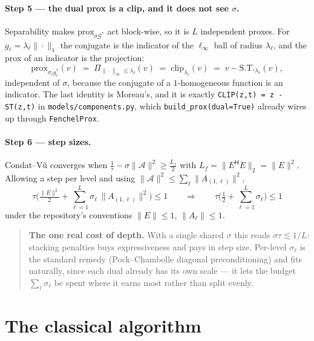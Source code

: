 \documentclass[11pt]{article}
\newcommand{\ST}{\mathrm{S.T.}}
\newcommand{\clip}{\mathrm{clip}}
\newcommand{\bA}{\mathcal{A}}
\newcommand{\bG}{\mathcal{G}}
\newcommand{\adj}{{\mathsf H}}
\newcommand{\Aell}{A_{(1,\ell)}}
\begin{document}
\paragraph{Step 5 --- the dual prox is a clip, and it does not see $\sigma$.}\label{step:prox}
Separability makes $\mathrm{prox}_{\sigma\bG^*}$ act block-wise, so it is $L$ independent proxes. For
$g_\ell = \lambda_\ell\|\cdot\|_1$ the conjugate is the indicator of the $\ell_\infty$ ball of radius
$\lambda_\ell$, and the prox of an indicator is the projection:
\[
  \mathrm{prox}_{\sigma_\ell g_\ell^*}(v)
  \;=\; \Pi_{\|\cdot\|_\infty\le\lambda_\ell}(v)
  \;=\; \clip_{\lambda_\ell}(v) \;=\; v - \ST_{\lambda_\ell}(v),
\]
independent of $\sigma$, because the conjugate of a $1$-homogeneous function is an indicator. The last
identity is Moreau's, and it is exactly \texttt{CLIP(z,t) = z - ST(z,t)} in
\texttt{models/components.py}, which \texttt{build\_prox(dual=True)} already wires up through
\texttt{FenchelProx}.

\paragraph{Step 6 --- step sizes.}
Condat--V\~u converges when $\tfrac1\tau - \sigma\|\bA\|^2 \ge \tfrac{L_f}{2}$ with
$L_f = \|E^\adj E\|_2 = \|E\|^2$. Allowing a step per level and using
$\|\bA\|^2 \le \sum_\ell\|\Aell\|^2$,
\begin{equation}\label{eq:step}
  \tau\Big(\tfrac{\|E\|^2}{2} + \sum_{\ell=1}^{L}\sigma_\ell\,\|\Aell\|^2\Big) \le 1
  \qquad\Longrightarrow\qquad
  \tau\Big(\tfrac12 + \sum_{\ell=1}^{L}\sigma_\ell\Big) \le 1
\end{equation}
under the repository's conventions $\|E\|\le1$, $\|A_\ell\|\le1$.

\begin{quote}\color{flag}
\textbf{The one real cost of depth.} With a single shared $\sigma$ this reads $\sigma\tau \lesssim 1/L$:
stacking penalties buys expressiveness and pays in step size. Per-level $\sigma_\ell$ is the standard remedy
(Pock--Chambolle diagonal preconditioning) and fits naturally, since each dual already has its own scale ---
it lets the budget $\sum_\ell\sigma_\ell$ be spent where it earns most rather than split evenly.
\end{quote}

\section{The classical algorithm}
\end{document}
